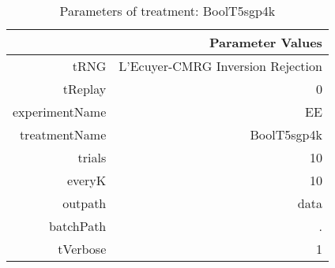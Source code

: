 \begin{table}[ht]
\centering
\begin{tabular}{rr}
  \hline
 & Parameter Values \\ 
  \hline
tRNG & L'Ecuyer-CMRG Inversion Rejection \\ 
  tReplay & 0 \\ 
  experimentName & EE \\ 
  treatmentName & BoolT5sgp4k \\ 
  trials & 10 \\ 
  everyK & 10 \\ 
  outpath & data \\ 
  batchPath & . \\ 
  tVerbose & 1 \\ 
   \hline
\end{tabular}
\caption{ Parameters of treatment: BoolT5sgp4k 
} 
\end{table}
